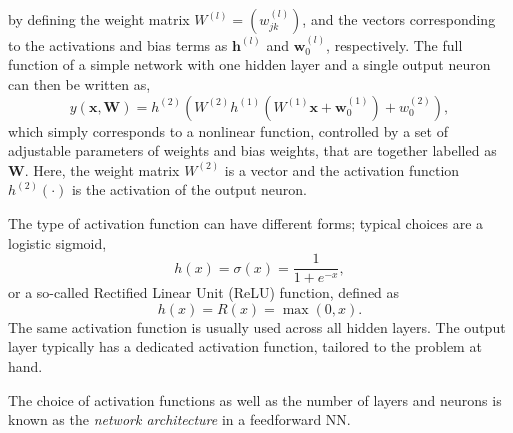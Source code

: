 by defining the weight matrix $W^{(l)} = \left(w^{(l)}_{jk} \right)$, and the vectors corresponding to the activations and bias terms as $\mathbf{h}^{(l)}$ and  $\mathbf{w}^{(l)}_0$, respectively.
The full function of a simple network with one hidden layer and a single output neuron can then be written as,
\begin{equation}
    y(\mathbf{x}, \mathbf{W}) = h^{(2)} \left( W^{(2)} h^{(1)} \left(  W^{(1)} \mathbf{x} + \mathbf{w}^{(1)}_{0}    \right) + w^{(2)}_{0} \right),
\end{equation}
which simply corresponds to a nonlinear function, controlled by a set of adjustable parameters of weights and bias weights, that are together labelled as $\mathbf{W}$. Here, the weight matrix $W^{(2)}$ is a vector and the activation function $h^{(2)}(\cdot)$ is the activation of the output neuron.

The type of activation function can have different forms; typical choices are a logistic sigmoid,
\begin{equation}
    \label{eq:logistic-sigmoid}
    h(x)= \sigma(x) = {\frac {1}{1+e^{-x}}},
\end{equation}
or a so-called Rectified Linear Unit (ReLU) function, defined as
\begin{equation}
    {h(x)= R(x) = \max(0,x)}.    
\end{equation}
The same activation function is usually used across all hidden layers.
The output layer typically has a dedicated activation function, tailored to the problem at hand.

The choice of activation functions as well as the number of layers and neurons is known as the \emph{network architecture} in a feedforward NN. 

